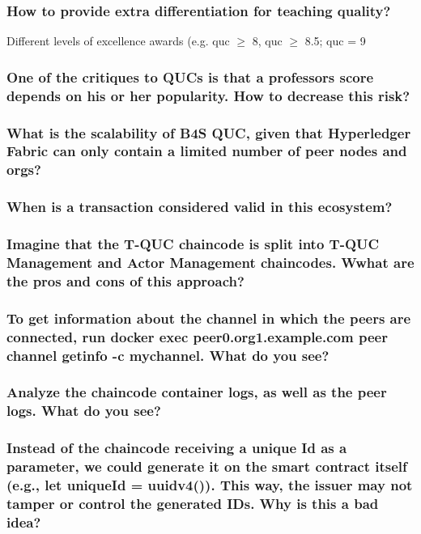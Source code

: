 \documentclass[12pt,a4paper]{article}
\theoremstyle{definition}
\begin{document}
\subsubsection*{How to provide extra differentiation for teaching quality?}

Different levels of excellence awards (e.g. quc $\geq$ 8, quc $\geq$ 8.5; quc = 9

\subsubsection*{One of the critiques to QUCs is that a professors score depends on his or her popularity. How to decrease this risk?}


\subsubsection*{What is the scalability of B4S QUC, given that Hyperledger Fabric can only contain a limited number of peer nodes and orgs?}


\subsubsection*{When is a transaction considered valid in this ecosystem?}

\subsubsection*{Imagine that the T-QUC chaincode is split into T-QUC Management and Actor Management chaincodes. Wwhat are the pros and cons of this approach?}


\subsubsection*{To get information about the channel in which the peers are connected, run {docker exec peer0.org1.example.com peer channel getinfo -c mychannel}. What do you see?}



\subsubsection*{Analyze the chaincode container logs, as well as the peer logs. What do you see?}


\subsubsection*{Instead of the chaincode receiving a unique Id as a parameter, we could generate it on the smart contract itself (e.g., let uniqueId = uuidv4()). This way, the issuer may not tamper or control the generated IDs. Why is this a bad idea?}



\end{document}
